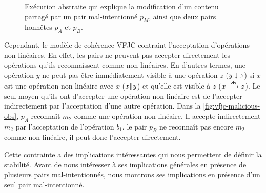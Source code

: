 \begin{figure}[htb]
\centering
{}
\caption[Opérations non-linéaires]{Exécution abstraite qui explique la modification d'un contenu partagé par un pair mal-intentionné $p_M$, ainsi que deux pairs honnêtes $p_A$ et $p_B$.}\label{fig:vfjc-malicious-obs}
\end{figure}

Cependant, le modèle de cohérence \acl{VFJC} contraint l'acceptation d'opérations non-linéaires.
En effet, les pairs ne peuvent pas accepter directement les opérations qu'ils reconnaissent comme non-linéaires.
En d'autres termes, une opération $y$ ne peut pas être immédiatement visible à une opération $z$ ($y \downarrow z$) si $x$ est une opération non-linéaire avec $x$ ($x \| y$) et qu'elle est visible à $z$ ($x \overset{\mathsf{vis}}{\longrightarrow} z$).
Le seul moyen qu'ils ont d'accepter une opération non-linéaire est de l'accepter indirectement par l'acceptation d'une autre opération.
Dans la \autoref{fig:vfjc-malicious-obs}, $p_A$ reconnaît $m_2$ comme une opération non-linéaire.
Il accepte indirectement $m_2$ par l'acceptation de l'opération $b_1$.
le pair $p_B$ ne reconnaît pas encore $m_2$ comme non-linéaire, il peut donc l'accepter directement.

Cette contrainte a des implications intéressantes qui nous permettent de définir la stabilité.
Avant de nous intéresser à ses implications générales en présence de plusieurs pairs mal-intentionnés, nous montrons ses implications en présence d'un seul pair mal-intentionné.

